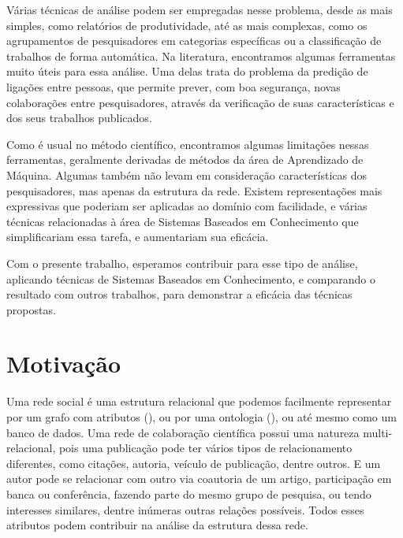 Várias técnicas de análise podem ser empregadas nesse problema, desde as mais simples, como relatórios de produtividade, até as mais complexas, como os agrupamentos de pesquisadores em categorias específicas ou a classificação de trabalhos de forma automática. Na literatura, encontramos algumas ferramentas muito úteis para essa análise. Uma delas trata do problema da predição de ligações entre pessoas, que permite prever, com boa segurança, novas colaborações entre pesquisadores, através da verificação de suas características e dos seus trabalhos publicados.

Como é usual no método científico, encontramos algumas limitações nessas ferramentas, geralmente derivadas de métodos da área de Aprendizado de Máquina. Algumas também não levam em consideração características dos pesquisadores, mas apenas da estrutura da rede. Existem representações mais expressivas que poderiam ser aplicadas ao domínio com facilidade, e várias técnicas relacionadas à área de Sistemas Baseados em Conhecimento que simplificariam essa tarefa, e aumentariam sua eficácia.


Com o presente trabalho, esperamos contribuir para esse tipo de análise, aplicando técnicas de Sistemas Baseados em Conhecimento, e comparando o resultado com outros trabalhos, para demonstrar a eficácia das técnicas propostas.

\section{Motivação}
\label{sec:motivacao}

Uma rede social é uma estrutura relacional que podemos facilmente representar por um grafo com atributos (\citet{Cervantes2014}), ou por uma ontologia (\citet{Anaue2009}), ou até mesmo como um banco de dados. Uma rede de colaboração científica possui uma natureza multi-relacional, pois uma publicação pode ter vários tipos de relacionamento diferentes, como citações, autoria, veículo de publicação, dentre outros. E um autor pode se relacionar com outro via coautoria de um artigo, participação em banca ou conferência, fazendo parte do mesmo grupo de pesquisa, ou tendo interesses similares, dentre inúmeras outras relações possíveis. Todos esses atributos podem contribuir na análise da estrutura dessa rede.

